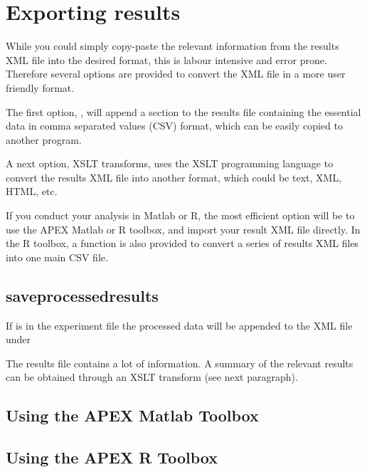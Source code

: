 


\section{Exporting results}

While you could simply copy-paste the relevant information from the results XML file into the desired format, this is labour intensive and error prone. Therefore several options are provided to convert the XML file in a more user friendly format.

The first option, , will append a section to the results file containing the essential data in comma separated values (CSV) format, which can be easily copied to another program.

A next option, XSLT transforms, uses the XSLT programming language to convert the results XML file into another format, which could be text, XML, HTML, etc.

If you conduct your analysis in Matlab or R, the most efficient option will be to use the APEX Matlab or R toolbox, and import your result XML file directly. In the R toolbox, a function is also provided to convert a series of results XML files into one main CSV file.

\subsection{saveprocessedresults}


If  is  in the experiment
file the processed data will be appended to the XML file under


The results file contains a lot of information. A summary of the
relevant results can be obtained through an XSLT transform (see
next paragraph).



\subsection{Using the APEX Matlab Toolbox}


\subsection{Using the APEX R Toolbox}

